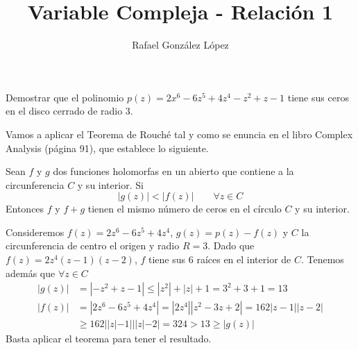 \documentclass[twoside]{article}
\begin{document}
\title{Variable Compleja - Relación 1}
\author{Rafael González López}
\maketitle

\begin{ejercicio}{5}
Demostrar que el polinomio $p(z)=2x^6-6z^5+4z^4-z^2+z-1$ tiene sus ceros en el disco cerrado de radio $3$.
\begin{solucion}
Vamos a aplicar el Teorema de Rouché tal y como se enuncia en el libro Complex Analysis (página 91), que establece lo siguiente.
\begin{theorem}
Sean $f$ y $g$ dos funciones holomorfas en un abierto que contiene a la circunferencia $C$ y su interior. Si 
$$|g(z)|<|f(z)| \qquad \forall z \in C
$$
Entonces $f$ y $f+g$ tienen el mismo número de ceros en el  círculo $C$ y su interior. 
\end{theorem}
Consideremos $f(z)=2z^6-6z^5+4z^4$, $g(z)=p(z)-f(z)$ y $C$ la circunferencia de centro el origen y radio $R=3$. Dado que $f(z)=2z^4(z-1)(z-2)$, $f$ tiene sus 6 raíces en el interior de $C$. Tenemos además que $\forall z \in C$ 
\begin{align*}
|g(z)|&=|-z^2+z-1|\leq |z^2|+|z|+1 = 3^2+3+1=13\\
|f(z)|&=|2z^6-6z^5+4z^4|=|2z^4||z^2-3z+2|=162|z-1||z-2|\\
&\geq 162||z|-1|||z|-2| = 324 > 13 \geq |g(z)|
\end{align*}
Basta aplicar el teorema para tener el resultado.
\end{solucion}
\end{ejercicio}
\end{document}
